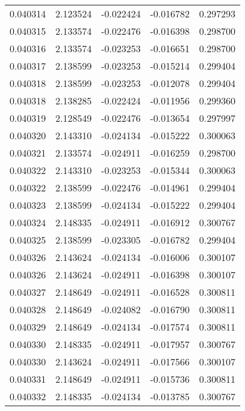 \begin{tabular}{lrrrr}
0.040314    &  2.123524 & -0.022424 & -0.016782 &             0.297293 \\
0.040315    &  2.133574 & -0.022476 & -0.016398 &             0.298700 \\
0.040316    &  2.133574 & -0.023253 & -0.016651 &             0.298700 \\
0.040317    &  2.138599 & -0.023253 & -0.015214 &             0.299404 \\
0.040318    &  2.138599 & -0.023253 & -0.012078 &             0.299404 \\
0.040318    &  2.138285 & -0.022424 & -0.011956 &             0.299360 \\
0.040319    &  2.128549 & -0.022476 & -0.013654 &             0.297997 \\
0.040320    &  2.143310 & -0.024134 & -0.015222 &             0.300063 \\
0.040321    &  2.133574 & -0.024911 & -0.016259 &             0.298700 \\
0.040322    &  2.143310 & -0.023253 & -0.015344 &             0.300063 \\
0.040322    &  2.138599 & -0.022476 & -0.014961 &             0.299404 \\
0.040323    &  2.138599 & -0.024134 & -0.015222 &             0.299404 \\
0.040324    &  2.148335 & -0.024911 & -0.016912 &             0.300767 \\
0.040325    &  2.138599 & -0.023305 & -0.016782 &             0.299404 \\
0.040326    &  2.143624 & -0.024134 & -0.016006 &             0.300107 \\
0.040326    &  2.143624 & -0.024911 & -0.016398 &             0.300107 \\
0.040327    &  2.148649 & -0.024911 & -0.016528 &             0.300811 \\
0.040328    &  2.148649 & -0.024082 & -0.016790 &             0.300811 \\
0.040329    &  2.148649 & -0.024134 & -0.017574 &             0.300811 \\
0.040330    &  2.148335 & -0.024911 & -0.017957 &             0.300767 \\
0.040330    &  2.143624 & -0.024911 & -0.017566 &             0.300107 \\
0.040331    &  2.148649 & -0.024911 & -0.015736 &             0.300811 \\
0.040332    &  2.148335 & -0.024134 & -0.013785 &             0.300767 \\

\end{tabular}
